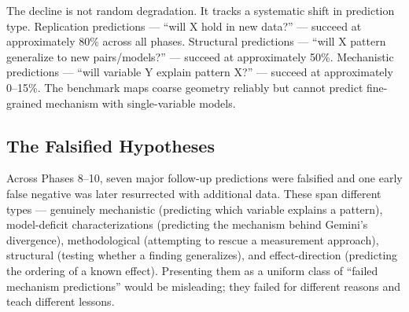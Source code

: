 The decline is not random degradation. It tracks a systematic shift in prediction type. Replication predictions --- ``will X hold in new data?'' --- succeed at approximately 80\% across all phases. Structural predictions --- ``will X pattern generalize to new pairs/models?'' --- succeed at approximately 50\%. Mechanistic predictions --- ``will variable Y explain pattern X?'' --- succeed at approximately 0--15\%. The benchmark maps coarse geometry reliably but cannot predict fine-grained mechanism with single-variable models.

\subsection{The Falsified Hypotheses}\label{the-falsified-hypotheses}

Across Phases 8--10, seven major follow-up predictions were falsified and one early false negative was later resurrected with additional data. These span different types --- genuinely mechanistic (predicting which variable explains a pattern), model-deficit characterizations (predicting the mechanism behind Gemini's divergence), methodological (attempting to rescue a measurement approach), structural (testing whether a finding generalizes), and effect-direction (predicting the ordering of a known effect). Presenting them as a uniform class of ``failed mechanism predictions'' would be misleading; they failed for different reasons and teach different lessons.

